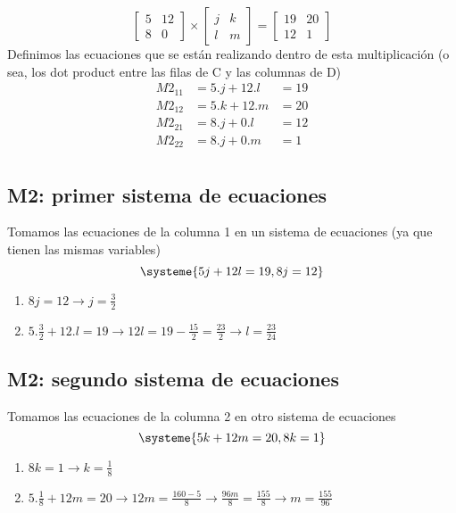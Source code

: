 \documentclass[11pt]{article}
\begin{document}
\[
\begin{bmatrix}
5 & 12 \\
8 & 0
\end{bmatrix}
\times
\begin{bmatrix}
j & k \\
l & m
\end{bmatrix}
=
\begin{bmatrix}
19 & 20 \\
12 & 1
\end{bmatrix}
\]
Definimos las ecuaciones que se están realizando dentro de esta multiplicación (o sea, los dot product entre las filas de C y las columnas de D)
\begin{align*}
M2_{11}&=5.j + 12.l&=19\\
M2_{12}&=5.k + 12.m&=20\\
M2_{21}&=8.j + 0.l&=12\\
M2_{22}&=8.j + 0.m&=1\\
\end{align*}
\subsection{M2: primer sistema de ecuaciones}
Tomamos las ecuaciones de la columna 1 en un sistema de ecuaciones (ya que tienen las mismas variables)
\begin{equation*}
\systeme{
5j+12l = 19,
8j = 12
}
\end{equation*}
\begin{enumerate}
\item $8j = 12 \rightarrow \boxed{j=\frac{3}{2}}$
\item $5.\frac{3}{2} + 12.l=19 \rightarrow 12l=19 - \frac{15}{2} = \frac{23}{2} \rightarrow \boxed{l = \frac{23}{24}}$
\end{enumerate}
\newpage
\subsection{M2: segundo sistema de ecuaciones}
Tomamos las ecuaciones de la columna 2 en otro sistema de ecuaciones
\begin{equation*}
\systeme{
5k+12m = 20,
8k = 1
}
\end{equation*}
\begin{enumerate}
\item $8k = 1 \rightarrow \boxed{k=\frac{1}{8}}$
\item $5.\frac{1}{8} + 12m = 20 \rightarrow 12m = \frac{160-5}{8} \rightarrow \frac{96m}{8} = \frac{155}{8} \rightarrow \boxed{m = \frac{155}{96}}$
\end{enumerate}
\end{document}
